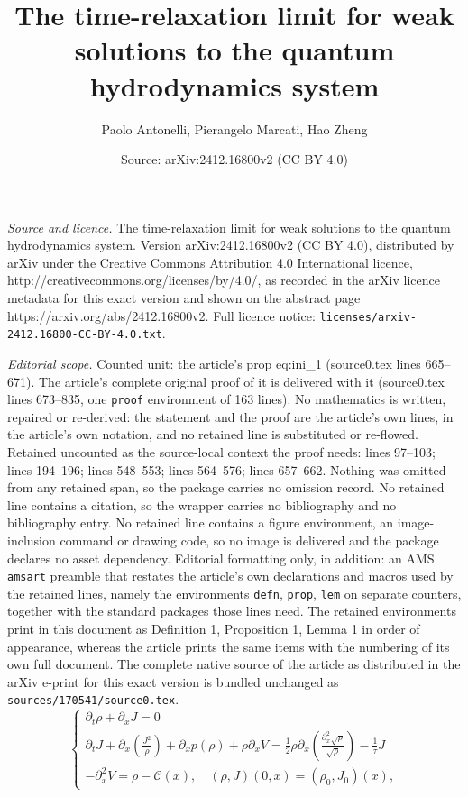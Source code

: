 \documentclass[10pt,a4paper]{amsart}
\title{The time-relaxation limit for weak solutions to the quantum hydrodynamics system}
\author{Paolo Antonelli, Pierangelo Marcati, Hao Zheng}
\date{Source: arXiv:2412.16800v2 (CC BY 4.0)}
\def\d{{\partial}}
\begin{document}
\maketitle

\noindent\emph{Source and licence.} The time-relaxation limit for weak solutions to the quantum hydrodynamics system. Version arXiv:2412.16800v2 (CC BY 4.0), distributed by arXiv under the Creative Commons Attribution 4.0 International licence, http://creativecommons.org/licenses/by/4.0/, as recorded in the arXiv licence metadata for this exact version and shown on the abstract page https://arxiv.org/abs/2412.16800v2. Full licence notice: \texttt{licenses/arxiv-2412.16800-CC-BY-4.0.txt}.\par\smallskip

\noindent\textit{Editorial scope.} Counted unit: the article's prop eq:ini\_1 (source0.tex lines 665--671). The article's complete original proof of it is delivered with it (source0.tex lines 673--835, one \texttt{proof} environment of 163 lines). No mathematics is written, repaired or re-derived: the statement and the proof are the article's own lines, in the article's own notation, and no retained line is substituted or re-flowed.  Retained uncounted as the source-local context the proof needs: lines 97--103; lines 194--196; lines 548--553; lines 564--576; lines 657--662.  Nothing was omitted from any retained span, so the package carries no omission record.  No retained line contains a citation, so the wrapper carries no bibliography and no bibliography entry.  No retained line contains a figure environment, an image-inclusion command or drawing code, so no image is delivered and the package declares no asset dependency.  Editorial formatting only, in addition: an AMS \texttt{amsart} preamble that restates the article's own declarations and macros used by the retained lines, namely the environments \texttt{defn}, \texttt{prop}, \texttt{lem} on separate counters, together with the standard packages those lines need.  The retained environments print in this document as Definition 1, Proposition 1, Lemma 1 in order of appearance, whereas the article prints the same items with the numbering of its own full document.  The complete native source of the article as distributed in the arXiv e-print for this exact version is bundled unchanged as \texttt{sources/170541/source0.tex}.
\begin{equation}\label{eq:QHD}
\begin{cases}
\d_{t}\rho+\d_xJ=0\\
\d_{t}J+\d_x\left(\frac{J^2}{\rho}\right)+\d_x p(\rho)+\rho\d_x V=\frac{1}{2}\rho\d_x\left(\frac{\d_x^2\sqrt\rho}{\sqrt\rho}\right)-\frac{1}{\tau}J\\
-\d_x^2V=\rho-\mathcal{C}(x),\quad (\rho,J)(0,x)=(\rho_0,J_0)(x),
\end{cases}
\end{equation}
\end{document}
